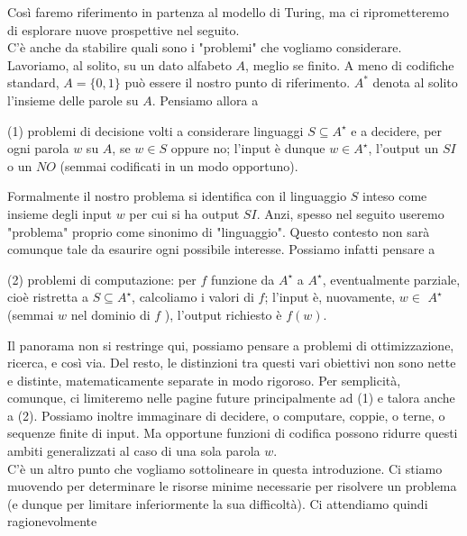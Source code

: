 Così faremo riferimento in partenza al modello di Turing, ma ci riprometteremo
di esplorare nuove prospettive nel seguito.\\

C'è anche da stabilire quali sono i "problemi" che vogliamo considerare.
Lavoriamo, al solito, su un dato alfabeto $A$, meglio se finito. A meno di
codifiche standard, $A=\{0,1\}$ può essere il nostro punto di riferimento. $A^*$
denota al solito l'insieme delle parole su $A$. Pensiamo allora a

\begin{center}
    (1) problemi
    di decisione volti a considerare linguaggi $S \subseteq A^{\star}$ e a decidere,
    per ogni parola $w$ su $A$, se $w \in S$ oppure no; l'input è dunque $w \in
        A^{\star}$, l'output un $S I$ o un $N O$ (semmai codificati in un modo
    opportuno).
\end{center}

Formalmente il nostro problema si identifica con il linguaggio $S$ inteso come
insieme degli input $w$ per cui si ha output $SI$. Anzi, spesso nel seguito
useremo "problema" proprio come sinonimo di "linguaggio". Questo contesto non
sarà comunque tale da esaurire ogni possibile interesse. Possiamo infatti
pensare a

\begin{center}
    (2) problemi di computazione: per $f$ funzione da $A^{\star}$ a
    $A^{\star}$, eventualmente parziale, cioè ristretta a $S \subseteq A^{\star}$,
    calcoliamo i valori di $f$; l'input è, nuovamente, $w \in$ $A^{\star}$ (semmai
    $w$ nel dominio di $f$ ), l'output richiesto è $f(w)$.
\end{center}



Il panorama non si restringe qui, possiamo pensare a problemi di ottimizzazione,
ricerca, e così via. Del resto, le distinzioni tra questi vari obiettivi non
sono nette e distinte, matematicamente separate in modo rigoroso. Per
semplicità, comunque, ci limiteremo nelle pagine future principalmente ad (1) e
talora anche a (2). Possiamo inoltre immaginare di decidere, o computare,
coppie, o terne, o sequenze finite di input. Ma opportune funzioni di codifica
possono ridurre questi ambiti generalizzati al caso di una sola parola $w$.\\
C'è
un altro punto che vogliamo sottolineare in questa introduzione. Ci stiamo
muovendo per determinare le risorse minime necessarie per risolvere un problema
(e dunque per limitare inferiormente la sua difficoltà). Ci attendiamo quindi
ragionevolmente

